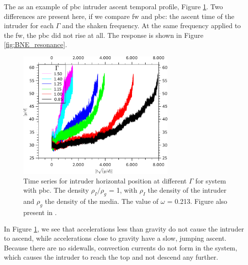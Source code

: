     The as an example of pbc intruder ascent temporal profile, Figure \ref{fig:BNE30000_Contorno}. Two differences are present here, if we compare fw and pbc: the ascent time of the intruder for each $\Gamma$ and the shaken frequency. At the same frequency applied to the fw, the pbc did not rise at all. The response is shown in Figure \ref{fig:BNE_resonance}.

\begin{figure}[H]
    \centering
    \includegraphics[width=0.7\textwidth]{04-figuras/BNE30000Contorno.pdf}
    \caption[BNE with periodic boundary: time series.]{Time series for intruder horizontal position at different $\Gamma$ for system with pbc. The density $\rho_I/\rho_g$ = 1, with $\rho_I$ the density of the intruder and $\rho_g$ the density of the media. The value of $\omega$ = 0.213. Figure also present in \cite{Large-deviation_quantification_of_boundary_conditions_on_the_Brazil_nut_effect}.}
    \label{fig:BNE30000_Contorno}
\end{figure}

    In Figure \ref{fig:BNE30000_Contorno}, we see that accelerations less than gravity do not cause the intruder to ascend, while accelerations close to gravity have a slow, jumping ascent. Because there are no sidewalls, convection currents do not form in the system, which causes the intruder to reach the top and not descend any further. 

